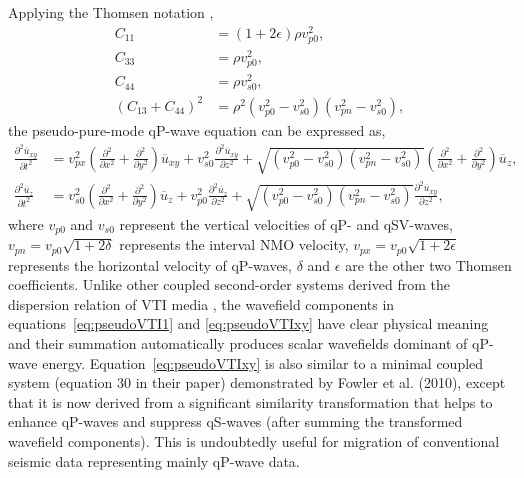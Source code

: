 Applying the Thomsen notation \cite[]{thomsen:1986},
\begin{equation}
\label{eq:ThomsenVTI}
\begin{split}
C_{11} &= (1+2\epsilon)\rho{v_{p0}^2}, \\
C_{33} &= \rho{v_{p0}^2}, \\
C_{44} &= \rho{v_{s0}^2}, \\
(C_{13}+C_{44})^2 &= \rho^2({v_{p0}^2}-{v_{s0}^2})({v_{pn}^2}-{v_{s0}^2}),
\end{split}
\end{equation}
the pseudo-pure-mode qP-wave equation can be expressed as,
\begin{equation}
\label{eq:pseudoVTIxy}
\begin{split}
\frac{\partial^2\overline{u}_{xy}}{\partial t^2} & =
 {v_{px}^2}(\frac{\partial^2}{\partial x^2}+\frac{\partial^2}{\partial y^2}){\overline{u}_{xy}}
+{v_{s0}^2}\frac{\partial^2{\overline{u}_{xy}}}{\partial z^2}
+ \sqrt{({v_{p0}^2}-{v_{s0}^2})({v_{pn}^2}-{v_{s0}^2})}
(\frac{\partial^2}{\partial x^2}+\frac{\partial^2}{\partial y^2}){\overline{u}_z}, \\
\frac{\partial^2\overline{u}_{z}}{\partial t^2} & =
{v_{s0}^2}(\frac{\partial^2}{\partial x^2}+\frac{\partial^2}{\partial y^2}){\overline{u}_{z}}
+ {v_{p0}^2}\frac{\partial^2{\overline{u}_z}}{\partial z^2}
+ \sqrt{({v_{p0}^2}-{v_{s0}^2})({v_{pn}^2}-{v_{s0}^2}) }
  \frac{\partial^2\overline{u}_{xy}}{\partial z^2},
\end{split}
\end{equation}
where $v_{p0}$ and $v_{s0}$ represent the vertical velocities of qP- and qSV-waves,
 $v_{pn} = v_{p0}\sqrt{1+2\delta}$ represents the interval
NMO velocity, $v_{px} = v_{p0}\sqrt{1+2\epsilon}$ 
represents the horizontal velocity of qP-waves,
$\delta$ and $\epsilon$ are the other two Thomsen coefficients.
 Unlike other coupled second-order systems derived from the dispersion relation 
of VTI media \cite[]{zhou:2006eage}, the wavefield components in
 equations~\ref{eq:pseudoVTI1} and \ref{eq:pseudoVTIxy}
have clear physical meaning and their summation automatically produces scalar wavefields dominant of qP-wave energy.
 Equation~\ref{eq:pseudoVTIxy} is also similar to a minimal coupled system (equation 30 in their paper) 
demonstrated by Fowler
 et al. (2010), except that it is now derived from a significant similarity transformation that helps to
enhance qP-waves and suppress qS-waves (after summing the transformed wavefield components). 
 This is undoubtedly useful for migration of conventional seismic data representing mainly qP-wave data.

